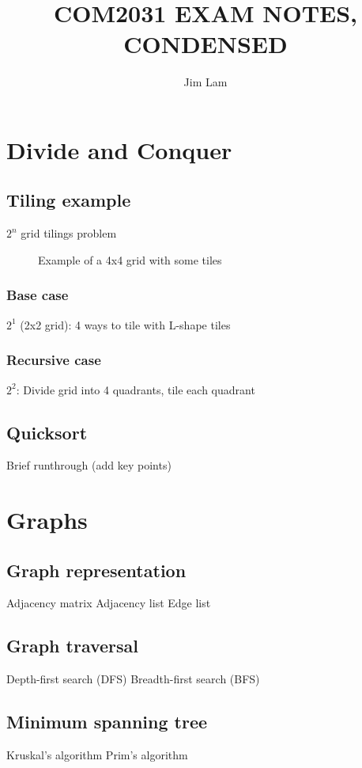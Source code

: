 \documentclass{article}
\begin{document}
\title{COM2031 EXAM NOTES, CONDENSED}
\author{Jim Lam}
\maketitle

\section{Divide and Conquer}
\subsection{Tiling example}
$2^n$ grid tilings problem

\begin{figure}[htbp]
    \centering
    \caption{Example of a 4x4 grid with some tiles}
\end{figure}

\subsubsection{Base case}
$2^1$ (2x2 grid): 4 ways to tile with L-shape tiles

\subsubsection{Recursive case}
$2^2$: Divide grid into 4 quadrants, tile each quadrant

\subsection{Quicksort}
Brief runthrough (add key points)

\section{Graphs}
\subsection{Graph representation}
\begin{outline}
    \1 Adjacency matrix
    \1 Adjacency list
    \1 Edge list
\end{outline}

\subsection{Graph traversal}
\begin{outline}
    \1 Depth-first search (DFS)
    \1 Breadth-first search (BFS)
\end{outline}

\subsection{Minimum spanning tree}
\begin{outline}
    \1 Kruskal's algorithm
    \1 Prim's algorithm
\end{outline}
\end{document}

